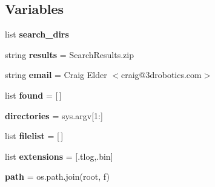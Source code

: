 \subsection*{Variables}
\begin{DoxyCompactItemize}
\item 
list {\bfseries search\+\_\+dirs}
\item 
\mbox{\label{namespacepymavlink_1_1tools_1_1MPU6KSearch_ac0205e09e9160c156c91decf18d0b6c0}} 
string {\bfseries results} = \textquotesingle{}Search\+Results.\+zip\textquotesingle{}
\item 
\mbox{\label{namespacepymavlink_1_1tools_1_1MPU6KSearch_addf5782d97897730d0cb3b7410787906}} 
string {\bfseries email} = \textquotesingle{}Craig Elder $<$craig@3drobotics.\+com$>$\textquotesingle{}
\item 
\mbox{\label{namespacepymavlink_1_1tools_1_1MPU6KSearch_ac237d9dc19ad865c06c3b254b1413ea0}} 
list {\bfseries found} = \mbox{[}$\,$\mbox{]}
\item 
\mbox{\label{namespacepymavlink_1_1tools_1_1MPU6KSearch_a91724bc509807606cd6a2e1598b58891}} 
{\bfseries directories} = sys.\+argv\mbox{[}1\+:\mbox{]}
\item 
\mbox{\label{namespacepymavlink_1_1tools_1_1MPU6KSearch_aca86a704134fd3da4bb5925d74832d36}} 
list {\bfseries filelist} = \mbox{[}$\,$\mbox{]}
\item 
\mbox{\label{namespacepymavlink_1_1tools_1_1MPU6KSearch_ab42858fbaf5e3782f567e13183d9ea07}} 
list {\bfseries extensions} = \mbox{[}\textquotesingle{}.tlog\textquotesingle{},\textquotesingle{}.bin\textquotesingle{}\mbox{]}
\item 
\mbox{\label{namespacepymavlink_1_1tools_1_1MPU6KSearch_a159243f0ffefc2196fac676fca1d67c1}} 
{\bfseries path} = os.\+path.\+join(root, f)
\item 
\mbox{\label{namespacepymavlink_1_1tools_1_1MPU6KSearch_ac07a87a94d378396fc6958ca6fcb3064}} 

\end{DoxyCompactItemize}
